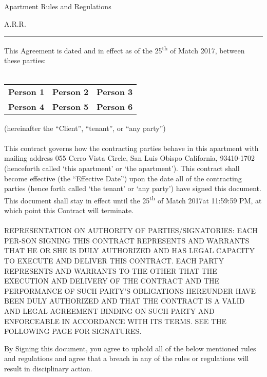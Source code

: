 \documentclass[10pt]{article}
\newcommand{\dateEffective}{25\textsuperscript {th} of Match 2017}
\newcommand{\dateNullification}{25\textsuperscript {th} of Match 2017}
\newcommand{\personOne}{Person 1}
\newcommand{\personTwo}{Person 2}
\newcommand{\personThree}{Person 3}
\newcommand{\personFour}{Person 4}
\newcommand{\personFive}{Person 5}
\newcommand{\personSix}{Person 6}
\begin{document}
	\begin{center}
		{\Large Apartment Rules and Regulations}
	\end{center}
\begin{center}
	
	{\normalsize  A.R.R.}
\end{center}
\hrule height .1mm

\vspace{.5cm}

\noindent This Agreement is dated and in effect as of the \dateEffective, between these parties:\\
\\
\begin{center}
	\begin{tabular}{ c c c }
		{\bf \personOne} & {\bf \personTwo} & {\bf \personThree}\\
		{\bf {\bf \personFour}} & {\bf \personFive} & {\bf \personSix}
	\end{tabular}
\end{center}

\noindent (hereinafter the ``Client'', ``tenant'', or ``any party'')\\ \\

\noindent This contract governs how the contracting parties behave in this apartment with mailing address 055 Cerro Vista Circle, San Luis Obispo California, 93410-1702 (henceforth called ‘this apartment’ or ‘the apartment’). This contract shall become effective (the “Effective Date”) upon the date all of the contracting parties (hence forth called ‘the tenant’ or ‘any party’) have signed this document. This document shall stay in effect until the \dateNullification\space at 11:59:59 PM, at which point this Contract will terminate.
\\ \\
\noindent REPRESENTATION ON AUTHORITY OF PARTIES/SIGNATORIES: EACH PER-SON SIGNING THIS CONTRACT REPRESENTS AND WARRANTS THAT HE OR SHE IS DULY AUTHORIZED AND HAS LEGAL CAPACITY TO EXECUTE AND DELIVER THIS CONTRACT. EACH PARTY REPRESENTS AND WARRANTS TO THE OTHER THAT THE EXECUTION AND DELIVERY OF THE CONTRACT AND THE PERFORMANCE OF SUCH PARTY’S OBLIGATIONS HEREUNDER HAVE BEEN DULY AUTHORIZED AND THAT THE CONTRACT IS A VALID AND LEGAL AGREEMENT BINDING ON SUCH PARTY AND ENFORCEABLE IN ACCORDANCE WITH ITS TERMS. SEE THE FOLLOWING PAGE FOR SIGNATURES.

\newpage
\noindent By Signing this document, you agree to uphold all of the below mentioned rules and regulations and agree that a breach in any of the rules or regulations will result in disciplinary action.
\def\s#1#2{\vbox{\hsize=4.5cm
		\kern2cm
		\hrule\kern1ex
		\hbox to \hsize{\strut\hfil #1 \hfil}
		\hbox to \hsize{\strut\hfil #2 \hfil}}}
\end{document}
